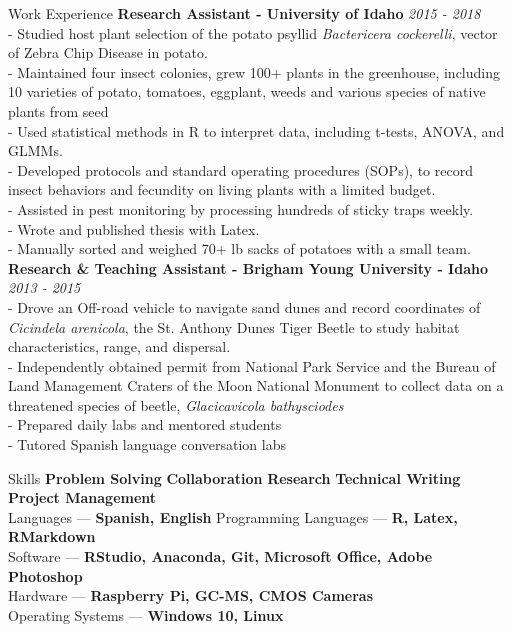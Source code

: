 \documentclass{resume} %
\begin{document}
\begin{rSection}{Work Experience}
\textbf{Research Assistant - University of Idaho} \hfill {\em \textit{2015 - 2018}}\\
- Studied host plant selection of the potato psyllid \textit{Bactericera cockerelli}, vector of Zebra Chip Disease in potato.\\
- Maintained four insect colonies, grew 100+ plants in the greenhouse, including 10 varieties of potato, tomatoes, eggplant, weeds and various species of native plants from seed\\
- Used statistical methods in R to interpret data, including t-tests, ANOVA, and GLMMs.\\
- Developed protocols and standard operating procedures (SOPs), to record insect behaviors and fecundity on living plants with a limited budget.\\
- Assisted in pest monitoring by processing hundreds of sticky traps weekly.\\
- Wrote and published thesis with Latex.\\
- Manually sorted and weighed 70+ lb sacks of potatoes with a small team.\\

\newpage
\textbf{Research \& Teaching Assistant - Brigham Young University - Idaho} \hfill {\em \textit{2013 - 2015}}\\
- Drove an Off-road vehicle to navigate sand dunes and record coordinates of \textit{Cicindela arenicola}, the St. Anthony Dunes Tiger Beetle to study habitat characteristics, range, and dispersal.\\
- Independently obtained permit from National Park Service and the Bureau of Land Management Craters of the Moon National Monument to collect data on a threatened species of beetle, \textit{Glacicavicola bathysciodes}\\
- Prepared daily labs and mentored students\\
- Tutored Spanish language conversation labs\\
	\hfill
\end{rSection}


\begin{rSection}{Skills}
\textbf{Problem Solving} \hfil \textbf{Collaboration} \hfil
\textbf{Research} \hfil
\textbf{Technical Writing} \hfil 
\textbf{Project Management}\\
Languages --- \textbf{Spanish, English} \hfill Programming Languages --- \textbf{R, Latex, RMarkdown}\\   
Software --- \textbf{RStudio, Anaconda, Git, Microsoft Office, Adobe Photoshop}\\
Hardware --- \textbf{Raspberry Pi, GC-MS, CMOS Cameras}\\
Operating Systems --- \textbf{Windows 10, Linux}
\end{rSection}
\end{document}
